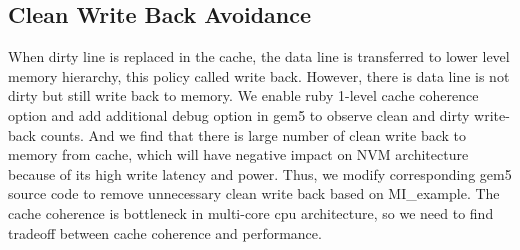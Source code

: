 \subsection{Clean Write Back Avoidance}
When dirty line is replaced in the cache, the data line is transferred to lower level memory hierarchy, this policy called write back. However, there is data line is not dirty but still write back to memory. We enable ruby 1-level cache coherence option and add additional debug option in gem5 to observe clean and dirty write-back counts. And we find that there is large number of clean write back to memory from cache, which will have negative impact on NVM architecture because of its high write latency and power. Thus, we modify corresponding gem5 source code to remove unnecessary clean write back based on MI\_example. The cache coherence is bottleneck in multi-core cpu architecture, so we need to find tradeoff between cache coherence and performance.   




